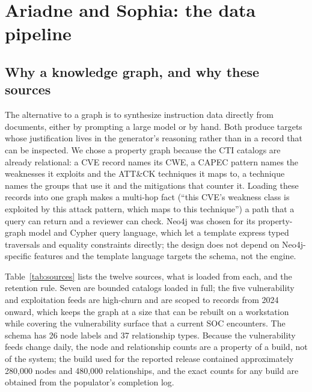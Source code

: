 \documentclass[twocolumn]{svjour3}
\begin{document}
\section{Ariadne and Sophia: the data pipeline}\label{sec:data}
\subsection{Why a knowledge graph, and why these sources}
The alternative to a graph is to synthesize instruction data directly from documents, either by prompting a large model or by hand. Both produce targets whose justification lives in the generator's reasoning rather than in a record that can be inspected. We chose a property graph because the CTI catalogs are already relational: a CVE record names its CWE, a CAPEC pattern names the weaknesses it exploits and the ATT\&CK techniques it maps to, a technique names the groups that use it and the mitigations that counter it. Loading these records into one graph makes a multi-hop fact (``this CVE's weakness class is exploited by this attack pattern, which maps to this technique'') a path that a query can return and a reviewer can check. Neo4j was chosen for its property-graph model and Cypher query language, which let a template express typed traversals and equality constraints directly; the design does not depend on Neo4j-specific features and the template language targets the schema, not the engine.

Table~\ref{tab:sources} lists the twelve sources, what is loaded from each, and the retention rule. Seven are bounded catalogs loaded in full; the five vulnerability and exploitation feeds are high-churn and are scoped to records from 2024 onward, which keeps the graph at a size that can be rebuilt on a workstation while covering the vulnerability surface that a current SOC encounters. The schema has 26 node labels and 37 relationship types. Because the vulnerability feeds change daily, the node and relationship counts are a property of a build, not of the system; the build used for the reported release contained approximately 280,000 nodes and 480,000 relationships, and the exact counts for any build are obtained from the populator's completion log. \cite{strom2018mitre,mitreCWE,mitreCAPEC,mitreCVE}
\end{document}
